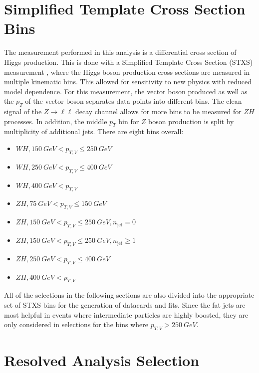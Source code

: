 \section{Simplified Template Cross Section Bins}

The measurement performed in this analysis is a differential
cross section of Higgs production.
This is done with a Simplified Template Cross Section (STXS) measurement \cite{Kato:2687920},
where the Higgs boson production cross sections are measured in multiple kinematic bins.
This allowed for sensitivity to new physics with reduced model dependence.
For this measurement, the vector boson produced as well as the $p_T$ of the vector boson
separates data points into different bins.
The clean signal of the $Z\rightarrow\ell\ell$ decay channel allows for more
bins to be measured for $ZH$ processes.
In addition, the middle $p_T$ bin for $Z$ boson production is split by multiplicity
of additional jets.
There are eight bins overall:
\begin{itemize}
\item $WH, \SI{150}{GeV} < p_{T,V} \le \SI{250}{GeV}$
\item $WH, \SI{250}{GeV} < p_{T,V} \le \SI{400}{GeV}$
\item $WH, \SI{400}{GeV} < p_{T,V}$
\item $ZH, \SI{75}{GeV} < p_{T,V} \le \SI{150}{GeV}$
\item $ZH, \SI{150}{GeV} < p_{T,V} \le \SI{250}{GeV}, n_\mathrm{jet} = 0$
\item $ZH, \SI{150}{GeV} < p_{T,V} \le \SI{250}{GeV}, n_\mathrm{jet} \ge 1$
\item $ZH, \SI{250}{GeV} < p_{T,V} \le \SI{400}{GeV}$
\item $ZH, \SI{400}{GeV} < p_{T,V}$
\end{itemize}
All of the selections in the following sections are also divided into the appropriate
set of STXS bins for the generation of datacards and fits.
Since the fat jets are most helpful in events where
intermediate particles are highly boosted,
they are only considered in selections for the bins where $p_{T,V} > \SI{250}{GeV}$.

\section{Resolved Analysis Selection}

